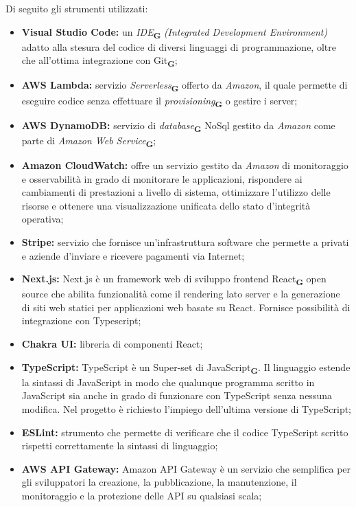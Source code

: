 Di seguito gli strumenti utilizzati:
\begin{itemize}
    \item \textbf{Visual Studio Code:} un \textit{IDE}\textsubscript{\textbf{G}} \textit{(Integrated Development Environment)} adatto alla stesura del codice di diversi linguaggi di programmazione, oltre che all'ottima integrazione con Git\textsubscript{\textbf{G}};
    \item \textbf{AWS Lambda:} servizio \textit{Serverless}\textsubscript{\textbf{G}} offerto da \textit{Amazon}, il quale permette di eseguire codice senza effettuare il \textit{provisioning}\textsubscript{\textbf{G}} o gestire i server;
    \item \textbf{AWS DynamoDB:} servizio di \textit{database}\textsubscript{\textbf{G}} NoSql gestito da \textit{Amazon} come parte di \textit{Amazon Web Service}\textsubscript{\textbf{G}};
    \item \textbf{Amazon CloudWatch:} offre un servizio gestito da \textit{Amazon} di monitoraggio e osservabilità in grado di monitorare le applicazioni, rispondere ai cambiamenti di prestazioni a livello di sistema, ottimizzare l'utilizzo delle risorse e ottenere una visualizzazione unificata dello stato d'integrità operativa;
    \item \textbf{Stripe:} servizio che fornisce un'infrastruttura software che permette a privati e aziende d'inviare e ricevere pagamenti via Internet;
    \item \textbf{Next.js:} Next.js è un framework web di sviluppo frontend React\textsubscript{\textbf{G}} open source che abilita funzionalità come il rendering lato server e la generazione di siti web statici per applicazioni web basate su React. Fornisce possibilità di integrazione con Typescript;
    \item \textbf{Chakra UI:} libreria di componenti React;
    \item \textbf{TypeScript:} TypeScript è un Super-set di JavaScript\textsubscript{\textbf{G}}. Il linguaggio estende la sintassi di JavaScript in modo che qualunque programma scritto in JavaScript sia anche in grado di funzionare con TypeScript senza nessuna modifica. Nel progetto è richiesto l'impiego dell'ultima versione di TypeScript;
    \item \textbf{ESLint:} strumento che permette di verificare che il codice TypeScript scritto rispetti correttamente la sintassi di linguaggio;
    \item \textbf{AWS API Gateway:} Amazon API Gateway è un servizio che semplifica per gli sviluppatori la creazione, la pubblicazione, la manutenzione, il monitoraggio e la protezione delle API su qualsiasi scala;

\end{itemize}
